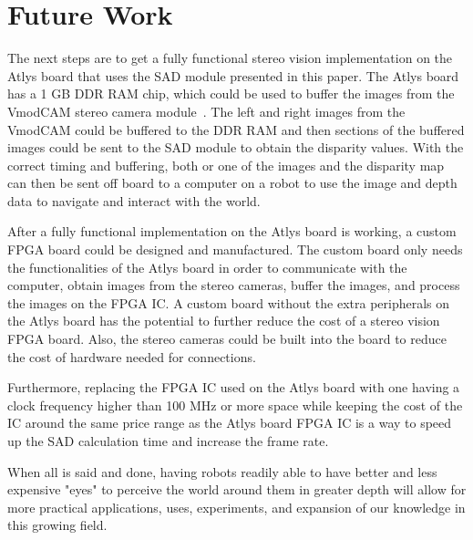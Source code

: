 \chapter{Future Work}

The next steps are to get a fully functional stereo vision implementation on the Atlys board that uses the SAD module presented in this paper. The Atlys board has a 1 GB DDR RAM chip, which could be used to buffer the images from the VmodCAM stereo camera module~\cite{atlysBoard}. The left and right images from the VmodCAM could be buffered to the DDR RAM and then sections of the buffered images could be sent to the SAD module to obtain the disparity values. With the correct timing and buffering, both or one of the images and the disparity map can then be sent off board to a computer on a robot to use the image and depth data to navigate and interact with the world.

After a fully functional implementation on the Atlys board is working, a custom FPGA board could be designed and manufactured. The custom board only needs the functionalities of the Atlys board in order to communicate with the computer, obtain images from the stereo cameras, buffer the images, and process the images on the FPGA IC. A custom board without the extra peripherals on the Atlys board has the potential to further reduce the cost of a stereo vision FPGA board. Also, the stereo cameras could be built into the board to reduce the cost of hardware needed for connections.

Furthermore, replacing the FPGA IC used on the Atlys board with one having a clock frequency higher than 100 MHz or more space while keeping the cost of the IC around the same price range as the Atlys board FPGA IC is a way to speed up the SAD calculation time and increase the frame rate.

When all is said and done, having robots readily able to have better and less expensive "eyes" to perceive the world around them in greater depth will allow for more practical applications, uses, experiments, and expansion of our knowledge in this growing field.